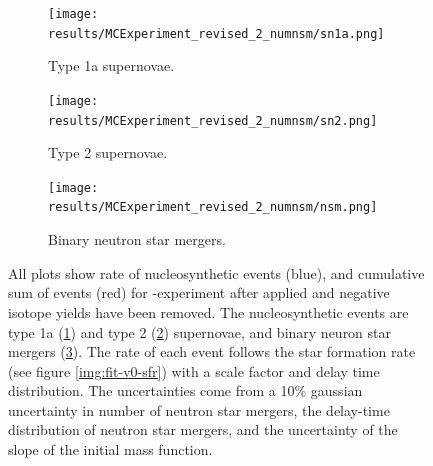 \begin{figure}[h]
  \centering
  \begin{subfigure}{\subfigwidth}
    \texttt{[image: results/MCExperiment\_revised\_2\_numnsm/sn1a.png]}
    \caption{ \label{fig:MCExperiment-numnsm-sn1a}
      Type 1a supernovae.
    }
  \end{subfigure}
  \begin{subfigure}{\subfigwidth}
    \texttt{[image: results/MCExperiment\_revised\_2\_numnsm/sn2.png]}
    \caption{ \label{fig:MCExperiment-numnsm-sn2}
      Type 2 supernovae.
    }
  \end{subfigure}
  \begin{subfigure}{\figwidth}
    \texttt{[image: results/MCExperiment\_revised\_2\_numnsm/nsm.png]}
    \caption{ \label{fig:MCExperiment-numnsm-nsm}
      Binary neutron star mergers.
    }
  \end{subfigure}
  \caption[Rate of nucleosynthetic events \expthree]{ \label{fig:MCExperiment-numnsm-rate}
    All plots show rate of nucleosynthetic events (blue), and cumulative sum of events (red) for \expthree-experiment
    after \betadecay applied and negative isotope yields have been removed.
    The nucleosynthetic events are type 1a (\ref{fig:MCExperiment-numnsm-sn1a}) and type 2 (\ref{fig:MCExperiment-numnsm-sn2})
    supernovae, and binary neuron star mergers (\ref{fig:MCExperiment-numnsm-nsm}).
    The rate of each event follows the star formation rate (see figure \ref{img:fit-v0-sfr}) with a scale factor and delay time distribution.
    The uncertainties come from a 10\% gaussian uncertainty in number of neutron star mergers, the delay-time distribution of neutron star mergers, and the uncertainty of the slope of the initial mass function.
  } 
\end{figure}
\FloatBarrier %

